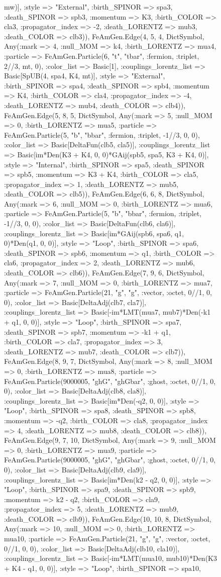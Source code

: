 \documentclass{revtex4}
\begin{document}
\begin{figure}[!htb]
\begin{center}
{mw)], :style => "External", :birth_SPINOR => spa3, :death_SPINOR => spb3, :momentum => K3, :birth_COLOR => cla3, :propagator_index => -2, :death_LORENTZ => mub3, :death_COLOR => clb3)), FeAmGen.Edge(4, 5, 4, Dict{Symbol, Any}(:mark => 4, :null_MOM => k4, :birth_LORENTZ => mua4, :particle => FeAmGen.Particle(6, "t", "tbar", :fermion, :triplet, 2//3, mt, 0), :color_list => Basic[1], :couplings_lorentz_list => Basic[SpUB(4, spa4, K4, mt)], :style => "External", :birth_SPINOR => spa4, :death_SPINOR => spb4, :momentum => K4, :birth_COLOR => cla4, :propagator_index => -4, :death_LORENTZ => mub4, :death_COLOR => clb4)), FeAmGen.Edge(5, 8, 5, Dict{Symbol, Any}(:mark => 5, :null_MOM => 0, :birth_LORENTZ => mua5, :particle => FeAmGen.Particle(5, "b", "bbar", :fermion, :triplet, -1//3, 0, 0), :color_list => Basic[DeltaFun(clb5, cla5)], :couplings_lorentz_list => Basic[im*Den(K3 + K4, 0, 0)*GAij(spb5, spa5, K3 + K4, 0)], :style => "Internal", :birth_SPINOR => spa5, :death_SPINOR => spb5, :momentum => K3 + K4, :birth_COLOR => cla5, :propagator_index => 1, :death_LORENTZ => mub5, :death_COLOR => clb5)), FeAmGen.Edge(6, 6, 8, Dict{Symbol, Any}(:mark => 6, :null_MOM => 0, :birth_LORENTZ => mua6, :particle => FeAmGen.Particle(5, "b", "bbar", :fermion, :triplet, -1//3, 0, 0), :color_list => Basic[DeltaFun(clb6, cla6)], :couplings_lorentz_list => Basic[im*GAij(spb6, spa6, q1, 0)*Den(q1, 0, 0)], :style => "Loop", :birth_SPINOR => spa6, :death_SPINOR => spb6, :momentum => q1, :birth_COLOR => cla6, :propagator_index => 2, :death_LORENTZ => mub6, :death_COLOR => clb6)), FeAmGen.Edge(7, 9, 6, Dict{Symbol, Any}(:mark => 7, :null_MOM => 0, :birth_LORENTZ => mua7, :particle => FeAmGen.Particle(21, "g", "g", :vector, :octet, 0//1, 0, 0), :color_list => Basic[DeltaAdj(clb7, cla7)], :couplings_lorentz_list => Basic[-im*LMT(mua7, mub7)*Den(-k1 + q1, 0, 0)], :style => "Loop", :birth_SPINOR => spa7, :death_SPINOR => spb7, :momentum => -k1 + q1, :birth_COLOR => cla7, :propagator_index => 3, :death_LORENTZ => mub7, :death_COLOR => clb7)), FeAmGen.Edge(8, 9, 7, Dict{Symbol, Any}(:mark => 8, :null_MOM => 0, :birth_LORENTZ => mua8, :particle => FeAmGen.Particle(9000005, "ghG", "ghGbar", :ghost, :octet, 0//1, 0, 0), :color_list => Basic[DeltaAdj(clb8, cla8)], :couplings_lorentz_list => Basic[im*Den(-q2, 0, 0)], :style => "Loop", :birth_SPINOR => spa8, :death_SPINOR => spb8, :momentum => -q2, :birth_COLOR => cla8, :propagator_index => 4, :death_LORENTZ => mub8, :death_COLOR => clb8)), FeAmGen.Edge(9, 7, 10, Dict{Symbol, Any}(:mark => 9, :null_MOM => 0, :birth_LORENTZ => mua9, :particle => FeAmGen.Particle(9000005, "ghG", "ghGbar", :ghost, :octet, 0//1, 0, 0), :color_list => Basic[DeltaAdj(clb9, cla9)], :couplings_lorentz_list => Basic[im*Den(k2 - q2, 0, 0)], :style => "Loop", :birth_SPINOR => spa9, :death_SPINOR => spb9, :momentum => k2 - q2, :birth_COLOR => cla9, :propagator_index => 5, :death_LORENTZ => mub9, :death_COLOR => clb9)), FeAmGen.Edge(10, 10, 8, Dict{Symbol, Any}(:mark => 10, :null_MOM => 0, :birth_LORENTZ => mua10, :particle => FeAmGen.Particle(21, "g", "g", :vector, :octet, 0//1, 0, 0), :color_list => Basic[DeltaAdj(clb10, cla10)], :couplings_lorentz_list => Basic[-im*LMT(mua10, mub10)*Den(K3 + K4 - q1, 0, 0)], :style => "Loop", :birth_SPINOR => spa10, }
\end{center}
\end{figure}
\end{document}
